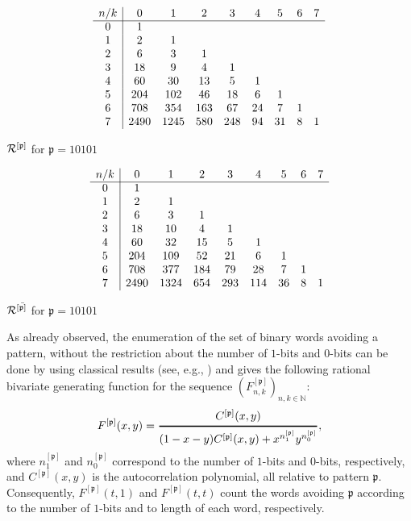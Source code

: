 \begin{table}[htb]
\hspace{-.5cm}
\parbox{.47\textwidth}{
\centering
$$
\begin{array}{c|cccccccc}
n/k  & 0 & 1 & 2 & 3 & 4 &5 &6 &7  \\ \cline{1-9}
0 & 1 & & & & & & &\\
1 & 2 & 1 & & &  & & &\\
2 & 6& 3 & 1 & & & &  &\\
3 & 18 & 9 & 4 & 1 & & &  &\\
4 & 60 & 30 & 13 & 5 & 1& & & \\
5 & 204 & 102 & 46 & 18 & 6 &1 & &\\
6 & 708 & 354 & 163 & 67 & 24 & 7& 1 &\\
7 & 2490 & 1245 &  580 &248 & 94 & 31 &  8 &1\\
\end{array}
$$
\caption{\label{Rprimoa} ${\cal{R}^{[\mathfrak{p}]}}$ for $\mathfrak{p}=10101$}
}
\hfill
\parbox{.47\textwidth}{
\centering
$$
\begin{array}{c|cccccccc}
n/k  & 0 & 1 & 2 & 3 & 4 &5 &6 &7  \\ \cline{1-9}
0 & 1 & & & & & & &\\
1 & 2 & 1 & & &  & & &\\
2 & 6& 3 & 1 & & & &  &\\
3 & 18 & 10 & 4 & 1 & & &  &\\
4 & 60 & 32 & 15 & 5 & 1& & & \\
5 & 204 & 109 & 52 & 21 & 6 &1 & &\\
6 & 708 & 377 & 184 & 79 & 28 & 7& 1 &\\
7 & 2490 & 1324 &  654 &293 & 114 & 36 &  8 &1\\
\end{array}
$$
\caption{\label{Rprimob} ${\cal{R}^{[\bar{\mathfrak{p}]}}}$ for $\mathfrak{p}=10101$}
}
\end{table}

As already observed, the enumeration of the set of binary words avoiding a
pattern, without the restriction about the number of $1$-bits  and $0$-bits can be
done by using classical results (see, e.g., \cite{GO80,GO81,SF96}) and gives
the following rational bivariate generating function for the sequence
$(F_{n,k}^{[\mathfrak{p}]})_{n,k \in \mathbb{N}}:$ $$F^{[\mathfrak{p}]}(x,y)
=\genfrac{}{}{1pt}{0}{C^{[\mathfrak{p}]}(x,y)}{(1-x-y)C^{[\mathfrak{p}]}(x,y)
+x^{n_1^{[\mathfrak{p}]}}y^{n_0^{[\mathfrak{p}]}}},$$ where
$n_1^{[\mathfrak{p}]}$ and  $n_0^{[\mathfrak{p}]}$ correspond to the number of
$1$-bits  and $0$-bits, respectively, and $C^{[\mathfrak{p}]}(x,y)$ is the
autocorrelation polynomial, all relative to pattern $\mathfrak{p}$.
Consequently, $F^{[\mathfrak{p}]}(t,1)$ and $F^{[\mathfrak{p}]}(t,t)$ count the
words avoiding $\mathfrak{p}$ according to the number of $1$-bits  and to length
of each word, respectively.

